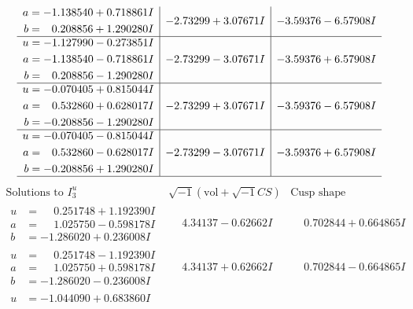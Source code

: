 \documentclass[1p]{elsarticle_modified}
\theoremstyle{definition}
\newcommand{\I}{\sqrt{-1}}
\begin{document}
$$\begin{array}{c|c|c}
\begin{aligned}
a &= -1.138540 + 0.718861 I \\
b &= \phantom{-}0.208856 + 1.290280 I\end{aligned}
 & -2.73299 + 3.07671 I & -3.59376 - 6.57908 I \\ \hline\begin{aligned}
u &= -1.127990 - 0.273851 I \\
a &= -1.138540 - 0.718861 I \\
b &= \phantom{-}0.208856 - 1.290280 I\end{aligned}
 & -2.73299 - 3.07671 I & -3.59376 + 6.57908 I \\ \hline\begin{aligned}
u &= -0.070405 + 0.815044 I \\
a &= \phantom{-}0.532860 + 0.628017 I \\
b &= -0.208856 - 1.290280 I\end{aligned}
 & -2.73299 + 3.07671 I & -3.59376 - 6.57908 I \\ \hline\begin{aligned}
u &= -0.070405 - 0.815044 I \\
a &= \phantom{-}0.532860 - 0.628017 I \\
b &= -0.208856 + 1.290280 I\end{aligned}
 & -2.73299 - 3.07671 I & -3.59376 + 6.57908 I\\
 \hline 
 \end{array}$$\newpage$$\begin{array}{c|c|c}  
\text{Solutions to }I^u_{3}& \I (\text{vol} + \sqrt{-1}CS) & \text{Cusp shape}\\
 \hline 
\begin{aligned}
u &= \phantom{-}0.251748 + 1.192390 I \\
a &= \phantom{-}1.025750 - 0.598178 I \\
b &= -1.286020 + 0.236008 I\end{aligned}
 & \phantom{-}4.34137 - 0.62662 I & \phantom{-}0.702844 + 0.664865 I \\ \hline\begin{aligned}
u &= \phantom{-}0.251748 - 1.192390 I \\
a &= \phantom{-}1.025750 + 0.598178 I \\
b &= -1.286020 - 0.236008 I\end{aligned}
 & \phantom{-}4.34137 + 0.62662 I & \phantom{-}0.702844 - 0.664865 I \\ \hline\begin{aligned}
u &= -1.044090 + 0.683860 I \\

\end{aligned}
\end{array}$$
\end{document}
